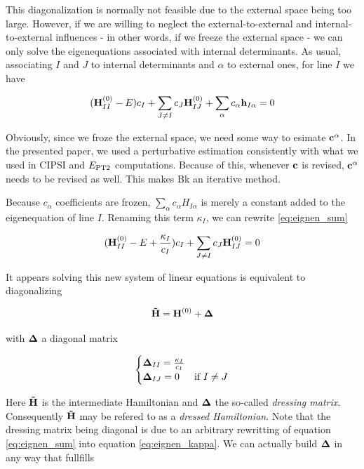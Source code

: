 \documentclass[./thesis.tex]{subfiles}
\begin{document}
This diagonalization is normally not feasible due to the external space being too large. However, if we are willing to neglect the external-to-external and internal-to-external influences - in other words, if we freeze the external space - we can only solve the eigenequations associated with internal determinants. As usual, associating $I$ and $J$ to internal determinants and $\alpha$ to external ones, for line $I$ we have

\begin{equation}
({\bf H}^{(0)}_{II} - E)c_I  + \sum_{J \neq I} {c_J {\bf H}^{(0)}_{IJ}} + \sum_\alpha {c_\alpha {\bf h}_{I \alpha}} = 0
\label{eq:eignen_sum}
\end{equation}


Obviously, since we froze the external space, we need some way to esimate ${\bf c}^\alpha$. In the presented paper, we used a perturbative estimation consistently with what we used in CIPSI and $E_\text{PT2}$ computations. Because of this, whenever $\bf c$ is revised, ${\bf c}^\alpha$ needs to be revised as well. This makes Bk an iterative method.

Because $c_\alpha$ coefficients are frozen, $\sum_\alpha {c_\alpha H_{I \alpha}}$ is merely a constant added to the eigenequation of line $I$. Renaming this term $\kappa_I$, we can rewrite \ref{eq:eignen_sum}

\begin{equation}
({\bf H}^{(0)}_{II} - E + \frac{\kappa_I}{c_I})c_I  + \sum_{J \neq I} {c_J {\bf H}^{(0)}_{IJ}} = 0
\label{eq:eignen_kappa}
\end{equation}

It appears solving this new system of linear equations is equivalent to diagonalizing 

\begin{equation}
{\bf \tilde H} = {\bf H}^{(0)} + {\bf \Delta}
\end{equation}


with ${\bf \Delta}$ a diagonal matrix

\begin{equation}
\begin{cases}
{\bf \Delta}_{II}=\frac{\kappa_I}{c_I}\\
{\bf \Delta}_{IJ}=0 & \text{if } I \neq J
\end{cases}
\end{equation}

Here ${\bf \tilde H}$ is the intermediate Hamiltonian and ${\bf \Delta}$ the so-called \emph{dressing matrix}. Consequently ${\bf \tilde H}$ may be refered to as a \emph{dressed Hamiltonian}. 
Note that the dressing matrix being diagonal is due to an arbitrary rewritting of equation \ref{eq:eignen_sum} into equation \ref{eq:eignen_kappa}. We can actually build ${\bf \Delta}$ in any way that fullfills
\end{document}
